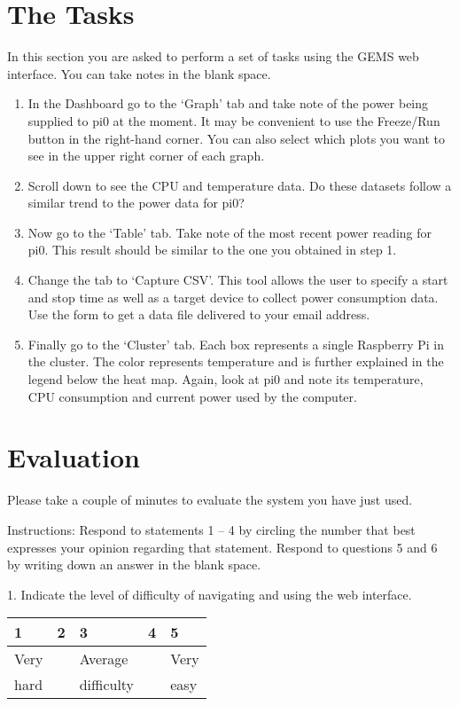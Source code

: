 \documentclass[12pt]{article}
\begin{document}
\section{The Tasks}
In this section you are asked to perform a set of tasks using the GEMS web interface. You can take notes in the blank space. 
\begin{enumerate}
  \item In the Dashboard go to the `Graph' tab and take note of the power being supplied to pi0 at the moment. It may be convenient to use the Freeze/Run button in the right-hand corner. You can also select which plots you want to see in the upper right corner of each graph.\\
  \item Scroll down to see the CPU and temperature data. Do these datasets follow a similar trend to the power data for pi0?\\
  \item Now go to the `Table' tab. Take note of the most recent power reading for pi0. This result should be similar to the one you obtained in step 1.\\
  \item Change the tab to `Capture CSV'. This tool allows the user to specify a start and stop time as well as a target device to collect power consumption data. Use the form to get a data file delivered to your email address.\\
  \item Finally go to the `Cluster' tab. Each box represents a single Raspberry Pi in the cluster. The color represents temperature and is further explained in the legend below the heat map. Again, look at pi0 and note its temperature, CPU consumption and current power used by the computer.
\end{enumerate}
\newpage
\section{Evaluation}
Please take a couple of minutes to evaluate the system you have just used.

Instructions: Respond to statements 1 -- 4 by circling the number that best expresses your opinion regarding that statement. Respond to questions 5 and 6 by writing down an answer in the blank space.

1. Indicate the level of difficulty of navigating and using the web interface.
\vspace{-4ex}
\begin{center}
\begin{tabular}{
|m{4em}|m{4em}|m{4em}|m{4em}|m{4em}|}
\hline
 1 & 2 & 3 & 4 & 5 \\ 
 \hline
 Very &&Average&& Very\\
 hard &&difficulty&& easy\\
  \hline
\end{tabular}
\end{center}
\end{document}
